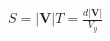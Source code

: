 \documentclass[border=2.5pt]{standalone}
\begin{document}
$\displaystyle S=|\bm V|T=\frac{d|\bm V|}{V_y}$
\end{document}
